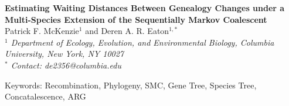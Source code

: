 \documentclass[11pt]{article}
\begin{document}
\begin{center}
	{\bf \Large
		Estimating Waiting Distances Between Genealogy Changes under a \\[0.25cm]
		Multi-Species Extension of the Sequentially Markov Coalescent
	}\\[0.5cm]

	Patrick F. McKenzie$^{1}$ and Deren A. R. Eaton$^{1, *}$\\[0.25cm]

	\emph{
	$^{1}$ Department of Ecology, Evolution, and Environmental Biology, Columbia University, New York, NY 10027\\[0.5cm]
	$^{*}$ Contact: de2356@columbia.edu\\[0.5cm]
	}
\end{center}

Keywords: Recombination, Phylogeny, SMC, Gene Tree, Species Tree, Concatalescence, ARG

\RaggedRight

\end{document}
